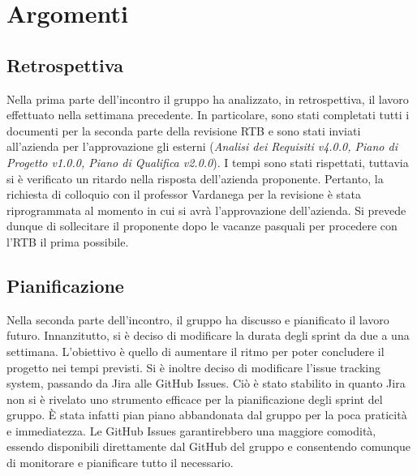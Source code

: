 \section{Argomenti}
\subsection{Retrospettiva}
Nella prima parte dell'incontro il gruppo ha analizzato, in retrospettiva, il lavoro effettuato nella settimana precedente.
In particolare, sono stati completati tutti i documenti per la seconda parte della revisione RTB e sono stati inviati all'azienda per l'approvazione gli esterni (\textit{Analisi dei Requisiti v4.0.0, Piano di Progetto v1.0.0, Piano di Qualifica v2.0.0}). I tempi sono stati rispettati, tuttavia si è verificato un ritardo nella risposta dell'azienda proponente. Pertanto, la richiesta di colloquio con il professor Vardanega per la revisione è stata riprogrammata al momento in cui si avrà l'approvazione dell'azienda. Si prevede dunque di sollecitare il proponente dopo le vacanze pasquali per procedere con l'RTB il prima possibile.

\subsection{Pianificazione}
\noindent Nella seconda parte dell'incontro, il gruppo ha discusso e pianificato il lavoro futuro. Innanzitutto, si è deciso di modificare la durata degli sprint da due a una settimana. L'obiettivo è quello di aumentare il ritmo per poter concludere il progetto nei tempi previsti. Si è inoltre deciso di modificare l'issue tracking system, passando da Jira alle GitHub Issues. Ciò è stato stabilito in quanto Jira non si è rivelato uno strumento efficace per la pianificazione degli sprint del gruppo. È stata infatti pian piano abbandonata dal gruppo per la poca praticità e immediatezza. Le GitHub Issues garantirebbero una maggiore comodità, essendo disponibili direttamente dal GitHub del gruppo e consentendo comunque di monitorare e pianificare tutto il necessario. 
\bigskip

